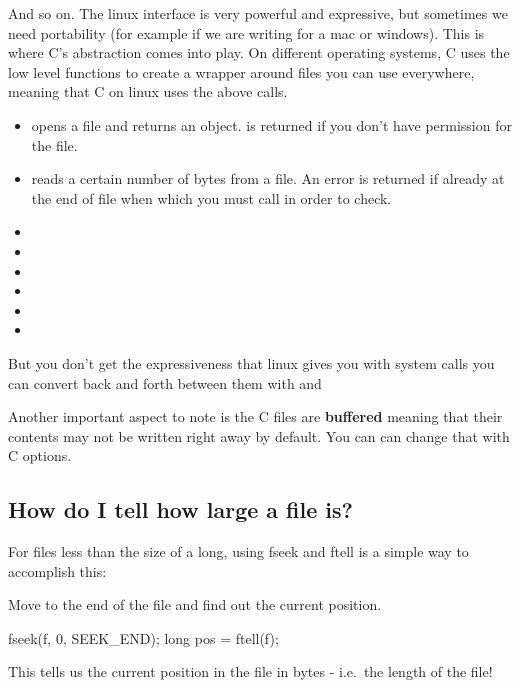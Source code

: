 \begin{enumerate}
 And so on. The linux interface is very powerful and expressive, but sometimes we need portability (for example if we are writing for a mac or windows). This is where C's abstraction comes into play. On different operating systems, C uses the low level functions to create a wrapper around files you can use everywhere, meaning that C on linux uses the above calls.

\begin{itemize}
\item {} opens a file and returns an object.  is returned if you don't have permission for the file.
\item {} reads a certain number of bytes from a file. An error is returned if already at the end of file when which you must call  in order to check.
\item {}
\item {} 
\item {} 
\item {} 
\item {} 
\item {}
\end{itemize}

 But you don't get the expressiveness that linux gives you with system calls you can convert back and forth between them with  and  

 Another important aspect to note is the C files are \textbf{buffered} meaning that their contents may not be written right away by default. You can can change that with C options.

\subsection{How do I tell how large a file is?}\label{how-do-i-tell-how-large-a-file-is}

For files less than the size of a long, using fseek and ftell is a
simple way to accomplish this:

Move to the end of the file and find out the current position.

\begin{code}[language=C]
fseek(f, 0, SEEK_END);
long pos = ftell(f);
\end{code}

This tells us the current position in the file in bytes - i.e.~the
length of the file!


\end{enumerate}
